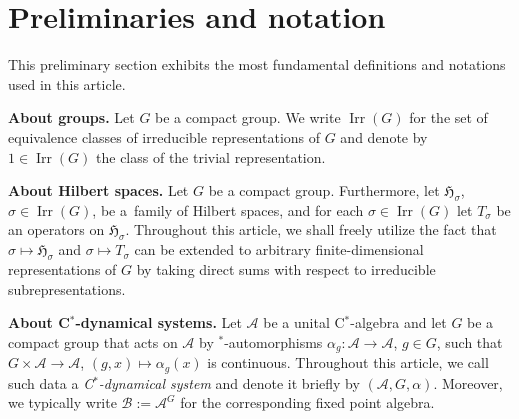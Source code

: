\documentclass[11pt]{article}
\numberwithin{equation}{section}
\numberwithin{equation}{section}
\newcommand*{\Star}{$^*$\nobreakdash}
\newcommand*{\hilb}{\mathfrak}		%
\newcommand*{\alg}{\mathcal}		%
\newcommand*{\hH}{\hilb{H}}			%
\newcommand*{\aA}{\alg{A}}			%
\newcommand*{\aB}{\alg{B}} 			%
\DeclareMathOperator{\Irrep}{Irr} 			%
\begin{document}
\section{Preliminaries and notation}\label{sec:pre}

This preliminary section exhibits the most fundamental definitions and notations used in this article.

{\bf About groups.}
Let $G$ be a compact group.
We write $\Irrep(G)$ for the set of equivalence classes of irreducible representations of $G$ and denote by $1 \in \Irrep(G)$ the class of the trivial representation.

{\bf About Hilbert spaces.}
Let $G$ be a compact group.
Furthermore, let $\hH_\sigma$, $\sigma \in \Irrep(G)$, be a~family of Hilbert spaces, and for each $\sigma \in \Irrep(G)$ let $T_\sigma$ be an operators on $\hH_\sigma$.
Throughout this article, we shall freely utilize the fact that $\sigma \mapsto \hH_\sigma$ and $\sigma \mapsto T_\sigma$ can be extended to arbitrary finite-dimensional representations of $G$ by taking direct sums with respect to irreducible subrepresentations.

{\bf About C\Star-dynamical systems.}
Let $\aA$ be a unital C\Star-algebra and let $G$ be a compact group that acts on $\aA$ by \Star-automorphisms $\alpha_g\colon \aA \to \aA$, $g \in G$, such that $G \times \aA \to \aA$, $(g,x) \mapsto \alpha_g(x)$ is continuous.
Throughout this article, we call such data a \emph{C\Star-dynamical system} and denote it briefly by $(\aA,G,\alpha)$.
Moreover, we typically write $\aB := \aA^G$ for the corresponding fixed point algebra.
\end{document}
